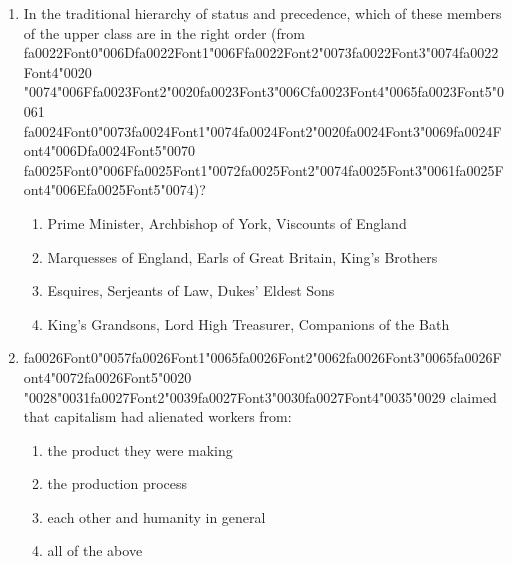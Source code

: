 \documentclass[12pt]{article}
\begin{document}
\begin{enumerate}[label=\arabic*.]
\begin{enumerate}[label=(\alph*)]
    \item the group of structural theories of society that he was reacting against
    \item the overall impression of ourselves that we try to give off to others
    \item a significant figure in early childhood who teaches us the general values of society
    \item an image of how people in the wider society might perceive our behaviour
\end{enumerate}
\item In the traditional hierarchy of status and precedence, which of these members of the upper class are in the right order (from {\csname fa0022Font0\endcsname\char"006D}{\csname fa0022Font1\endcsname\char"006F}{\csname fa0022Font2\endcsname\char"0073}{\csname fa0022Font3\endcsname\char"0074}{\csname fa0022Font4\endcsname\char"0020} {\char"0074}{\char"006F}{\csname fa0023Font2\endcsname\char"0020}{\csname fa0023Font3\endcsname\char"006C}{\csname fa0023Font4\endcsname\char"0065}{\csname fa0023Font5\endcsname\char"0061} {\csname fa0024Font0\endcsname\char"0073}{\csname fa0024Font1\endcsname\char"0074}{\csname fa0024Font2\endcsname\char"0020}{\csname fa0024Font3\endcsname\char"0069}{\csname fa0024Font4\endcsname\char"006D}{\csname fa0024Font5\endcsname\char"0070} {\csname fa0025Font0\endcsname\char"006F}{\csname fa0025Font1\endcsname\char"0072}{\csname fa0025Font2\endcsname\char"0074}{\csname fa0025Font3\endcsname\char"0061}{\csname fa0025Font4\endcsname\char"006E}{\csname fa0025Font5\endcsname\char"0074})?
\begin{enumerate}[label=(\alph*)]
    \item Prime Minister, Archbishop of York, Viscounts of England
    \item Marquesses of England, Earls of Great Britain, King's Brothers
    \item Esquires, Serjeants of Law, Dukes' Eldest Sons
    \item King's Grandsons, Lord High Treasurer, Companions of the Bath
\end{enumerate}
\item {\csname fa0026Font0\endcsname\char"0057}{\csname fa0026Font1\endcsname\char"0065}{\csname fa0026Font2\endcsname\char"0062}{\csname fa0026Font3\endcsname\char"0065}{\csname fa0026Font4\endcsname\char"0072}{\csname fa0026Font5\endcsname\char"0020} {\char"0028}{\char"0031}{\csname fa0027Font2\endcsname\char"0039}{\csname fa0027Font3\endcsname\char"0030}{\csname fa0027Font4\endcsname\char"0035}{\char"0029} claimed that capitalism had alienated workers from:
\begin{enumerate}[label=(\alph*)]
    \item the product they were making
    \item the production process
    \item each other and humanity in general
    \item all of the above
\end{enumerate}
\end{enumerate}
\end{document}
